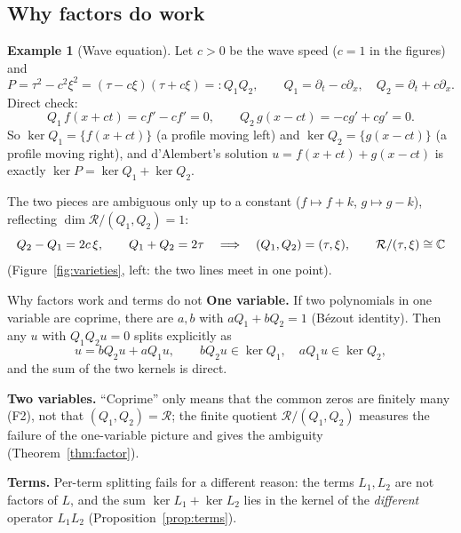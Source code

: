 \documentclass[11pt,a4paper]{article}
\theoremstyle{definition}
\newtheorem{example}{Example}[section]
\newcommand{\ring}{\mathcal{R}}
\DeclareMathOperator{\dimc}{dim}
\begin{document}
\subsection{Why factors do work}
\begin{example}[Wave equation]\label{ex:wave}
Let $c>0$ be the wave speed ($c=1$ in the figures) and
\[
P=\tau^2-c^2\xi^2=(\tau-c\xi)(\tau+c\xi)=:Q_1Q_2,\qquad Q_1=\partial_t-c\partial_x,\quad Q_2=\partial_t+c\partial_x .
\]
Direct check:
\[
Q_1\,f(x+ct)=cf'-cf'=0,\qquad Q_2\,g(x-ct)=-cg'+cg'=0 .
\]
So $\ker Q_1=\{f(x+ct)\}$ (a profile moving left) and $\ker Q_2=\{g(x-ct)\}$ (a profile moving right), and d'Alembert's solution $u=f(x+ct)+g(x-ct)$ is exactly $\ker P=\ker Q_1+\ker Q_2$.

The two pieces are ambiguous only up to a constant ($f\mapsto f+k$, $g\mapsto g-k$), reflecting $\dimc\ring/(Q_1,Q_2)=1$:
\[
Q_2-Q_1=2c\,\xi,\qquad Q_1+Q_2=2\tau\quad\Longrightarrow\quad(Q_1,Q_2)=(\tau,\xi),\qquad \ring/(\tau,\xi)\cong\C
\]
(Figure~\ref{fig:varieties}, left: the two lines meet in one point).
\end{example}
\begin{aside}{Why factors work and terms do not}
\textbf{One variable.} If two polynomials in one variable are coprime, there are $a,b$ with $aQ_1+bQ_2=1$ (B\'ezout identity). Then any $u$ with $Q_1Q_2u=0$ splits explicitly as
\[
u=bQ_2u+aQ_1u,\qquad bQ_2u\in\ker Q_1,\quad aQ_1u\in\ker Q_2,
\]
and the sum of the two kernels is direct.

\textbf{Two variables.} ``Coprime'' only means that the common zeros are finitely many (F2), not that $(Q_1,Q_2)=\ring$; the finite quotient $\ring/(Q_1,Q_2)$ measures the failure of the one-variable picture and gives the ambiguity (Theorem~\ref{thm:factor}).

\textbf{Terms.} Per-term splitting fails for a different reason: the terms $L_1,L_2$ are not factors of $L$, and the sum $\ker L_1+\ker L_2$ lies in the kernel of the \emph{different} operator $L_1L_2$ (Proposition~\ref{prop:terms}).
\end{aside}
\end{document}

